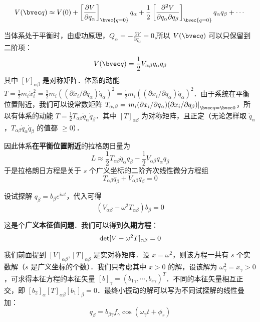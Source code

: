 \begin{equation}
V(\bvec q)\approx V(0)+\left[\frac{\partial V}{\partial q_\alpha}\right]_\bvec {q=0} q_\alpha+\frac{1}{2}\left[\frac{\partial^2V}{\partial q_\alpha\partial q_\beta}\right]_\bvec{q=0}q_\alpha q_\beta+\cdots
\end{equation}

当体系处于平衡时，由虚功原理，$Q_\alpha=-\frac{\partial V}{\partial q_\alpha}=0$,所以 $V(\bvec q)$ 可以只保留到二阶项：
\begin{equation}
V(\bvec q)=\frac{1}{2}V_{\alpha\beta}q_\alpha q_\beta
\end{equation}
其中 $[V]_{\alpha\beta}$ 是对称矩阵．体系的动能 $T=\frac{1}{2}m_i\dot{x}_i^2=\frac{1}{2}m_i((\partial \dot{x_i} / \partial \dot{q}_\alpha) \dot{q}_\alpha)^2= \frac{1}{2}m_i((\partial x_i/\partial q_\alpha)\dot{q}_\alpha)^2$．由于系统在平衡位置附近，我们可以设常数矩阵 $T_{\alpha,\beta}=\left.m_i(\partial x_i/\partial q_\alpha)(\partial x_i/\partial q_\beta)\right|_{\bvec q=\bvec 0}$，所以有体系的动能 $T=\frac{1}{2}T_{\alpha\beta} \dot{q}_\alpha \dot{q}_\beta$．其中 $[T]_{\alpha\beta}$ 为对称矩阵，且正定（无论怎样取 $\dot{q}_\alpha$，$T_{\alpha\beta} \dot{q}_\alpha \dot{q}_\beta$ 的值都 $\ge0$）．

因此体系\textbf{在平衡位置附近}的拉格朗日量为
\begin{equation}
L\approx\frac{1}{2}T_{\alpha\beta}\dot{q}_\alpha \dot{q}_\beta-\frac{1}{2}V_{\alpha\beta}q_\alpha q_\beta
\end{equation}
于是拉格朗日方程是关于 $s$ 个广义坐标的二阶齐次线性微分方程组
\begin{equation}
T_{\alpha\beta}\ddot{q}_\beta+V_{\alpha\beta}q_\beta=0
\end{equation}

设试探解 $q_\beta=b_\beta e^{i\omega t}$，代入可得
\begin{equation}
(V_{\alpha\beta} - \omega^2 T_{\alpha\beta}) b_\beta = 0
\end{equation}

这是个\textbf{广义本征值问题}．我们可以得到\textbf{久期方程}：
\begin{equation}
{\rm{det}}[V-\omega^2 T]_{\alpha\beta}=0 
\end{equation}

我们前面提到 $[V]_{\alpha\beta},[T]_{\alpha\beta}$ 是实对称矩阵．设 $x=\omega^2$，则该方程一共有 $s$ 个实数解（$s$ 是广义坐标的个数）．我们只考虑其中 $x>0$ 的解，设该解为 $\omega_\gamma^2=x_\gamma>0$，可求得本征方程的本征矢量 $[b]_\gamma=(b_{1\gamma},\cdots,b_{s\gamma})^T$．不同的本征矢量相互正交，即 $[b_2]_{\alpha} [T]_{\alpha\beta} [b_1]_{\beta}=0$．最终小振动的解可以写为不同试探解的线性叠加：
\begin{equation}
q_\beta = b_{\beta\gamma}f_\gamma \cos(\omega_\gamma t + \phi_r)
\end{equation}

